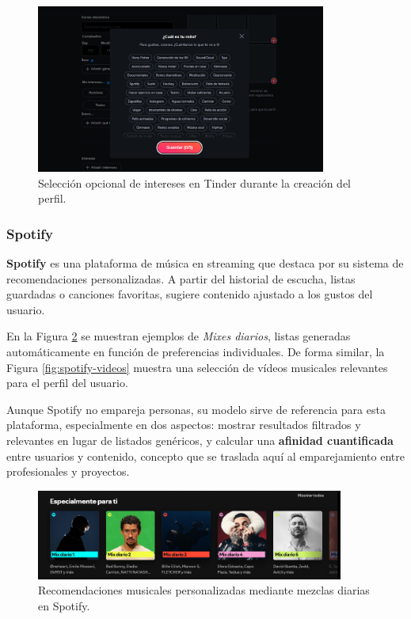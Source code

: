 \begin{figure}[H]
    \centering
    \includegraphics[width=0.85\textwidth]{figs/tinder-intereses.png}
    \caption{Selección opcional de intereses en Tinder durante la creación del perfil.}
    \label{fig:tinder-intereses}
\end{figure}

\subsubsection{Spotify}

\textbf{Spotify} \cite{spotify} es una plataforma de música en streaming que destaca por
su sistema de recomendaciones personalizadas. A partir del historial de escucha, listas
guardadas o canciones favoritas, sugiere contenido ajustado a los gustos del usuario.

En la Figura \ref{fig:spotify-mixes} se muestran ejemplos de \textit{Mixes diarios},
listas generadas automáticamente en función de preferencias individuales. De forma
similar, la Figura \ref{fig:spotify-videos} muestra una selección de vídeos musicales
relevantes para el perfil del usuario.

Aunque Spotify no empareja personas, su modelo sirve de referencia para esta plataforma,
especialmente en dos aspectos: mostrar resultados filtrados y relevantes en lugar de
listados genéricos, y calcular una \textbf{afinidad cuantificada} entre usuarios y
contenido, concepto que se traslada aquí al emparejamiento entre profesionales y proyectos.

\begin{figure}[H]
    \centering
    \includegraphics[width=0.9\textwidth]{figs/spotify-mixes.png}
    \caption{Recomendaciones musicales personalizadas mediante mezclas diarias en Spotify.}
    \label{fig:spotify-mixes}
\end{figure}

